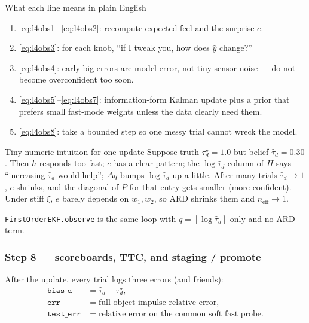 \documentclass[11pt,a4paper]{article}
\newcommand{\neff}{n_{\mathrm{eff}}}
\begin{document}
\begin{stepbox}{What each line means in plain English}
\begin{enumerate}[nosep]
\item \eqref{eq:l4obs1}--\eqref{eq:l4obs2}: recompute expected feel and the
  surprise $e$.
\item \eqref{eq:l4obs3}: for each knob, ``if I tweak you, how does $\hat y$
  change?''
\item \eqref{eq:l4obs4}: early big errors are model error, not tiny sensor
  noise --- do not become overconfident too soon.
\item \eqref{eq:l4obs5}--\eqref{eq:l4obs7}: information-form Kalman update
  plus a prior that prefers small fast-mode weights unless the data clearly
  need them.
\item \eqref{eq:l4obs8}: take a bounded step so one messy trial cannot wreck
  the model.
\end{enumerate}
\end{stepbox}

\begin{examplebox}{Tiny numeric intuition for one update}
Suppose truth $\tau_d^\star=1.0$ but belief $\hat\tau_d=0.30$.  Then $h$
responds too fast; $e$ has a clear pattern; the $\log\hat\tau_d$ column of $H$
says ``increasing $\hat\tau_d$ would help''; $\Delta q$ bumps $\log\hat\tau_d$
up a little.  After many trials $\hat\tau_d\to1$, $e$ shrinks, and the
diagonal of $P$ for that entry gets smaller (more confident).  Under stiff
$\xi$, $e$ barely depends on $w_1,w_2$, so ARD shrinks them and
$\neff\to1$.
\end{examplebox}

\texttt{FirstOrderEKF.observe} is the same loop with
$q=[\log\hat\tau_d]$ only and no ARD term.

\subsubsection{Step 8 --- scoreboards, TTC, and staging / promote}

After the update, every trial logs three errors (and friends):
\begin{align}
\texttt{bias\_d} &= \hat\tau_d - \tau_d^\star, \nonumber\\
\texttt{err} &= \text{full-object impulse relative error}, \nonumber\\
\texttt{test\_err} &= \text{relative error on the common soft fast probe}.
\label{eq:l4scores}
\end{align}
\end{document}

